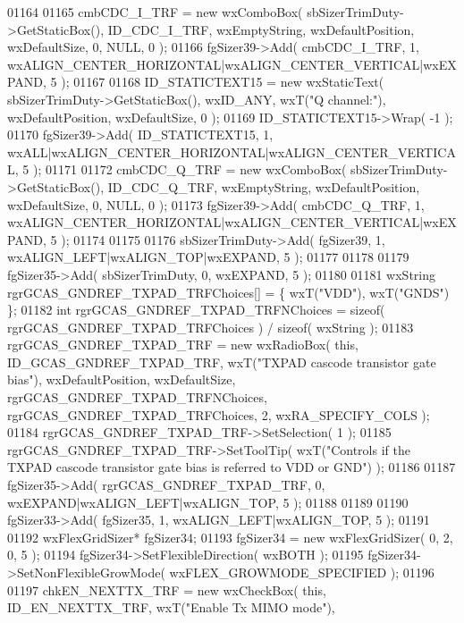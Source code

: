 \begin{DoxyCode}
01164     
01165     cmbCDC_I_TRF = \textcolor{keyword}{new} wxComboBox( sbSizerTrimDuty->GetStaticBox(), ID_CDC_I_TRF, wxEmptyString, 
      wxDefaultPosition, wxDefaultSize, 0, NULL, 0 ); 
01166     fgSizer39->Add( cmbCDC_I_TRF, 1, wxALIGN\_CENTER\_HORIZONTAL|wxALIGN\_CENTER\_VERTICAL|wxEXPAND, 5 );
01167     
01168     ID_STATICTEXT15 = \textcolor{keyword}{new} wxStaticText( sbSizerTrimDuty->GetStaticBox(), wxID\_ANY, wxT(\textcolor{stringliteral}{"Q channel:"}), 
      wxDefaultPosition, wxDefaultSize, 0 );
01169     ID_STATICTEXT15->Wrap( -1 );
01170     fgSizer39->Add( ID_STATICTEXT15, 1, wxALL|wxALIGN\_CENTER\_HORIZONTAL|wxALIGN\_CENTER\_VERTICAL, 5 );
01171     
01172     cmbCDC_Q_TRF = \textcolor{keyword}{new} wxComboBox( sbSizerTrimDuty->GetStaticBox(), ID_CDC_Q_TRF, wxEmptyString, 
      wxDefaultPosition, wxDefaultSize, 0, NULL, 0 ); 
01173     fgSizer39->Add( cmbCDC_Q_TRF, 1, wxALIGN\_CENTER\_HORIZONTAL|wxALIGN\_CENTER\_VERTICAL|wxEXPAND, 5 );
01174     
01175     
01176     sbSizerTrimDuty->Add( fgSizer39, 1, wxALIGN\_LEFT|wxALIGN\_TOP|wxEXPAND, 5 );
01177     
01178     
01179     fgSizer35->Add( sbSizerTrimDuty, 0, wxEXPAND, 5 );
01180     
01181     wxString rgrGCAS\_GNDREF\_TXPAD\_TRFChoices[] = \{ wxT(\textcolor{stringliteral}{"VDD"}), wxT(\textcolor{stringliteral}{"GNDS"}) \};
01182     \textcolor{keywordtype}{int} rgrGCAS\_GNDREF\_TXPAD\_TRFNChoices = \textcolor{keyword}{sizeof}( rgrGCAS\_GNDREF\_TXPAD\_TRFChoices ) / \textcolor{keyword}{sizeof}( wxString );
01183     rgrGCAS_GNDREF_TXPAD_TRF = \textcolor{keyword}{new} wxRadioBox( \textcolor{keyword}{this}, ID_GCAS_GNDREF_TXPAD_TRF, wxT(\textcolor{stringliteral}{"TXPAD cascode
       transistor gate bias"}), wxDefaultPosition, wxDefaultSize, rgrGCAS\_GNDREF\_TXPAD\_TRFNChoices, 
      rgrGCAS\_GNDREF\_TXPAD\_TRFChoices, 2, wxRA\_SPECIFY\_COLS );
01184     rgrGCAS_GNDREF_TXPAD_TRF->SetSelection( 1 );
01185     rgrGCAS_GNDREF_TXPAD_TRF->SetToolTip( wxT(\textcolor{stringliteral}{"Controls if the TXPAD cascode transistor gate bias is
       referred to VDD or GND"}) );
01186     
01187     fgSizer35->Add( rgrGCAS_GNDREF_TXPAD_TRF, 0, wxEXPAND|wxALIGN\_LEFT|wxALIGN\_TOP, 5 );
01188     
01189     
01190     fgSizer33->Add( fgSizer35, 1, wxALIGN\_LEFT|wxALIGN\_TOP, 5 );
01191     
01192     wxFlexGridSizer* fgSizer34;
01193     fgSizer34 = \textcolor{keyword}{new} wxFlexGridSizer( 0, 2, 0, 5 );
01194     fgSizer34->SetFlexibleDirection( wxBOTH );
01195     fgSizer34->SetNonFlexibleGrowMode( wxFLEX\_GROWMODE\_SPECIFIED );
01196     
01197     chkEN_NEXTTX_TRF = \textcolor{keyword}{new} wxCheckBox( \textcolor{keyword}{this}, ID_EN_NEXTTX_TRF, wxT(\textcolor{stringliteral}{"Enable Tx MIMO mode"}), 

\end{DoxyCode}
